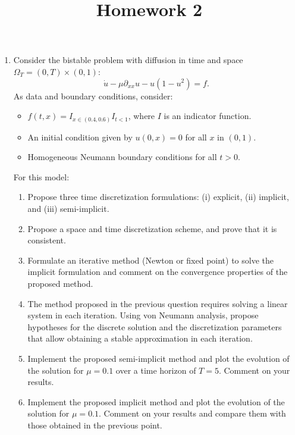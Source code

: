 \documentclass{article}
\title{Homework 2}
\date{}
\begin{document}
\maketitle
 
\instruccion

\begin{enumerate}
    \item Consider the bistable problem with diffusion in time and space $\Omega_T = (0,T)\times (0,1)$:
            $$ \dot u - \mu \partial_{xx} u - u(1-u^2) = f. $$
            As data and boundary conditions, consider:
            \begin{itemize}
                \item $f(t,x) = I_{x\in (0.4,0.6)}I_{t<1}$, where $I$ is an indicator function.
                \item An initial condition given by $u(0,x) = 0$ for all $x$ in $(0,1)$. 
                \item Homogeneous Neumann boundary conditions for all $t>0$. 
            \end{itemize}
            For this model:
            \begin{enumerate}
                \item{} Propose three time discretization formulations: (i) explicit, (ii) implicit, and (iii) semi-implicit. 
                \item{} Propose a space and time discretization scheme, and prove that it is consistent.
                \item{} Formulate an iterative method (Newton or fixed point) to solve the implicit formulation and comment on the convergence properties of the proposed method. 
                \item{} The method proposed in the previous question requires solving a linear system in each iteration. Using von Neumann analysis, propose hypotheses for the discrete solution and the discretization parameters that allow obtaining a stable approximation in each iteration.
                \item{} Implement the proposed semi-implicit method and plot the evolution of the solution for $\mu=0.1$ over a time horizon of $T=5$. Comment on your results.
                \item{} Implement the proposed implicit method and plot the evolution of the solution for $\mu=0.1$. Comment on your results and compare them with those obtained in the previous point.
            \end{enumerate}


\end{enumerate}
\end{document}
